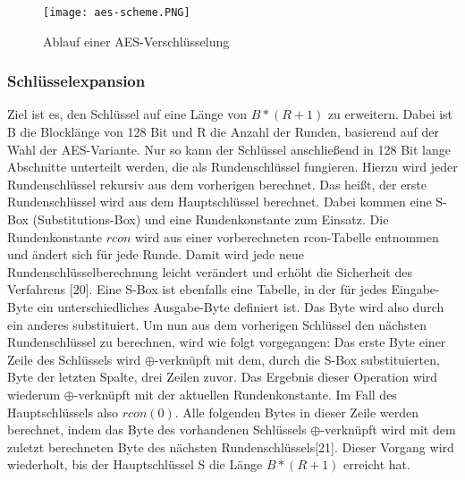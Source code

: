 \documentclass[conference,10pt,a4paper,twocolumn]{IEEEtran}
\begin{document}
\begin{figure}[h!]
\centering
\texttt{[image: aes-scheme.PNG]} 
\caption{Ablauf einer AES-Verschlüsselung}
\end{figure}

\bigskip
\subsubsection{Schlüsselexpansion}
Ziel ist es, den Schlüssel auf eine Länge von \begin{math}B * (R + 1)\end{math} zu erweitern. Dabei ist B die Blocklänge von 128 Bit und R die Anzahl der Runden, basierend auf der Wahl der AES-Variante. Nur so kann der Schlüssel anschließend in 128 Bit lange Abschnitte unterteilt werden, die als Rundenschlüssel fungieren. Hierzu wird jeder Rundenschlüssel rekursiv aus dem vorherigen berechnet. Das heißt, der erste Rundenschlüssel wird aus dem Hauptschlüssel berechnet. Dabei kommen eine S-Box (Substitutions-Box) und eine Rundenkonstante zum Einsatz. Die Rundenkonstante \begin{math}rcon\end{math} wird aus einer vorberechneten rcon-Tabelle entnommen und ändert sich für jede Runde. Damit wird jede neue Rundenschlüsselberechnung leicht verändert und erhöht die Sicherheit des Verfahrens [20]. Eine S-Box ist ebenfalls eine Tabelle, in der für jedes Eingabe-Byte ein unterschiedliches Ausgabe-Byte definiert ist. Das Byte wird also durch ein anderes substituiert. Um nun aus dem vorherigen Schlüssel den nächsten Rundenschlüssel zu berechnen, wird wie folgt vorgegangen:\linebreak
Das erste Byte einer Zeile des Schlüssels wird \begin{math}\oplus\end{math}-verknüpft mit dem, durch die S-Box substituierten, Byte der letzten Spalte, drei Zeilen zuvor. Das Ergebnis dieser Operation wird wiederum \begin{math}\oplus\end{math}-verknüpft mit der aktuellen Rundenkonstante. Im Fall des Hauptschlüssels also  \begin{math}rcon(0)\end{math}. Alle folgenden Bytes in dieser Zeile werden berechnet, indem das Byte des vorhandenen Schlüssels \begin{math}\oplus\end{math}-verknüpft wird mit dem zuletzt berechneten Byte des nächsten Rundenschlüssels[21].\linebreak
Dieser Vorgang wird wiederholt, bis der Hauptschlüssel S die Länge \begin{math}B * (R + 1)\end{math} erreicht hat.
\end{document}
